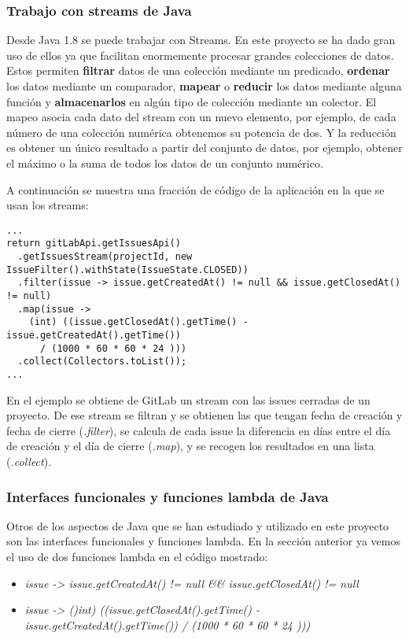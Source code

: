 \subsubsection{Trabajo con streams de Java}
Desde Java 1.8 se puede trabajar con Streams. En este proyecto se ha dado gran uso de ellos ya que facilitan enormemente procesar grandes colecciones de datos. Estos permiten \textbf{filtrar} datos de una colección mediante un predicado, \textbf{ordenar} los datos mediante un comparador, \textbf{mapear} o \textbf{reducir} los datos mediante alguna función y \textbf{almacenarlos} en algún tipo de colección mediante un colector. El mapeo asocia cada dato del stream con un nuevo elemento, por ejemplo, de cada número de una colección numérica obtenemos su potencia de dos. Y la reducción es obtener un único resultado a partir del conjunto de datos, por ejemplo, obtener el máximo o la suma de todos los datos de un conjunto numérico.

A continuación se muestra una fracción de código de la aplicación en la que se usan los streams:

{\tiny 
\begin{lstlisting}
...
return gitLabApi.getIssuesApi()
  .getIssuesStream(projectId, new IssueFilter().withState(IssueState.CLOSED))
  .filter(issue -> issue.getCreatedAt() != null && issue.getClosedAt() != null)
  .map(issue -> 
	(int) ((issue.getClosedAt().getTime() - issue.getCreatedAt().getTime()) 
	  / (1000 * 60 * 60 * 24 )))
  .collect(Collectors.toList());
...
\end{lstlisting}
}

En el ejemplo se obtiene de GitLab un stream con las issues cerradas de un proyecto. De ese stream se filtran y se obtienen las que tengan fecha de creación y fecha de cierre (\textit{.filter}), se calcula de cada issue la diferencia en días entre el día de creación y el día de cierre (\textit{.map}), y se recogen los resultados en una lista (\textit{.collect}).

\subsubsection{Interfaces funcionales y funciones lambda de Java}
Otros de los aspectos de Java que se han estudiado y utilizado en este proyecto son las interfaces funcionales y funciones lambda. En la sección anterior ya vemos el uso de dos funciones lambda en el código mostrado:
\begin{itemize}
	\tiny
	\item \textit{issue -> issue.getCreatedAt() != null \&\& issue.getClosedAt() != null}
	\item \textit{issue -> ()int) ((issue.getClosedAt().getTime() - issue.getCreatedAt().getTime()) / (1000 * 60 * 60 * 24 )))}
\end{itemize}


